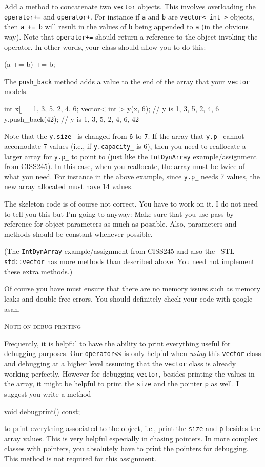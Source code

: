 Add a method to concatenate two \verb!vector! objects.
This involves overloading the \verb!operator+=! and \verb!operator+!.
For instance if \verb!a! and \verb!b! are \verb!vector< int >! objects,
then \verb!a += b! will result in the values of \verb!b! being appended
to \verb!a! (in the obvious way).
Note that \verb!operator+=! should return a reference to the object
invoking the operator.
In other words, your class should allow you to do this:
\begin{console}[fontsize=\footnotesize]
(a += b) += b;
\end{console}

The \verb!push_back! method adds a value to the end of the
array that your \verb!vector! models.
\begin{console}[frame=single,fontsize=\footnotesize]
int x[] = {1, 3, 5, 2, 4, 6};
vector< int > y(x, 6); // y is {1, 3, 5, 2, 4, 6}
y.push_back(42);       // y is {1, 3, 5, 2, 4, 6, 42}
\end{console}
Note that the \verb!y.size_! is changed from \verb!6! to \verb!7!.
If the array that \verb!y.p_! cannot accomodate 7 values
(i.e., if \verb!y.capacity_! is 6),
then you need to reallocate a larger array for \verb!y.p_! to
point to (just like the \verb!IntDynArray! example/assignment from CISS245).
In this case, when you reallocate, the array must be twice of
what you need.
For instance in the above example, since \verb!y.p_! needs 7 values,
the new array allocated must have 14 values.

The skeleton code is of course not correct. You have to work on it.
I do not need to tell you this but I'm going to anyway:
Make sure that you use pass-by-reference for object parameters
as much as possible.
Also, parameters and methods should be constant whenever possible.

(The \verb!IntDynArray! example/assignment from CISS245 and also
the \cpp\ STL \verb!std::vector! has more methods
than described above.
You need not implement these extra methods.)

Of course you have must ensure that there are no memory issues such as
memory leaks and double free errors.
You should definitely check your code with google asan.

\newpage
\textsc{Note on debug printing}

Frequently, it is helpful to have the ability to print everything
useful for debugging purposes.
Our \verb!operator<<! is only helpful when \textit{using} this
\verb!vector! class and debugging at a higher level assuming that
the \verb!vector! class is already working perfectly.
However for debugging \verb!vector!,
besides printing the values in the 
array, it might be helpful to print the \verb!size! and the pointer
\verb!p! as well.
I suggest you write a method
\begin{console}[fontsize=\footnotesize]
void debugprint() const;
\end{console}
to print everything associated to the object, i.e.,
print the \verb!size! and \verb!p! besides the array values.
This is very helpful especially in chasing pointers.
In more complex classes with pointers, you absolutely have to print the 
pointers for debugging.
This method is not required for this assignment.


